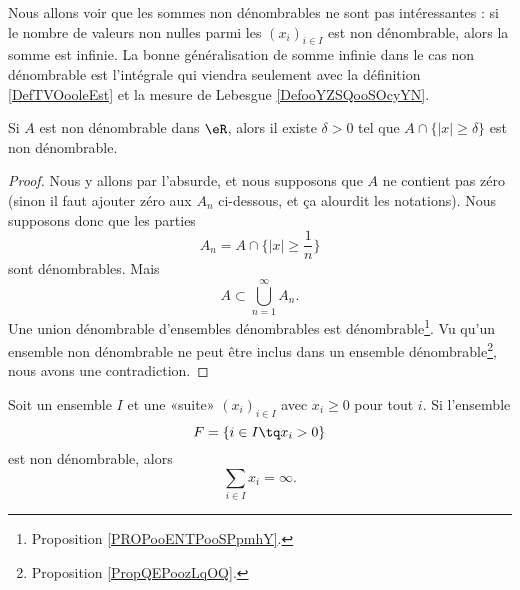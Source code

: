 Nous allons voir que les sommes non dénombrables ne sont pas intéressantes : si le nombre de valeurs non nulles parmi les \( (x_i)_{i\in I}\) est non dénombrable, alors la somme est infinie. La bonne généralisation de somme infinie dans le cas non dénombrable est l'intégrale qui viendra seulement avec la définition \ref{DefTVOooleEst} et la mesure de Lebesgue \ref{DefooYZSQooSOcyYN}.

\begin{lemma}       \label{LEMooYJCVooHajEbg}
	Si \( A\) est non dénombrable dans \( \eR\), alors il existe \( \delta>0\) tel que \( A\cap \{ | x |\geq \delta \}\) est non dénombrable.
\end{lemma}

\begin{proof}
	Nous y allons par l'absurde, et nous supposons que \( A\) ne contient pas zéro (sinon il faut ajouter zéro aux \( A_n\) ci-dessous, et ça alourdit les notations). Nous supposons donc que les parties
	\begin{equation}
		A_n=A\cap\{ | x |\geq \frac{1}{ n } \}
	\end{equation}
	sont dénombrables. Mais
	\begin{equation}
		A\subset \bigcup_{n=1}^{\infty}A_n.
	\end{equation}
	Une union dénombrable d'ensembles dénombrables est dénombrable\footnote{Proposition \ref{PROPooENTPooSPpmhY}.}. Vu qu'un ensemble non dénombrable ne peut être inclus dans un ensemble dénombrable\footnote{Proposition \ref{PropQEPoozLqOQ}.}, nous avons une contradiction.
\end{proof}

\begin{lemma}       \label{LEMooQIMGooOUpZjk}
	Soit un ensemble \( I\) et une «suite» \( (x_i)_{i\in I}\) avec \( x_i\geq 0\) pour tout \( i\). Si l'ensemble
	\begin{equation}
		F=\{ i\in I\tq x_i>0 \}
	\end{equation}
	est non dénombrable, alors
	\begin{equation}
		\sum_{i\in I}x_i=\infty.
	\end{equation}
\end{lemma}

